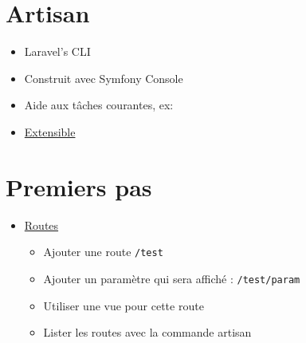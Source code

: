 \hypertarget{artisan}{%
\section{Artisan}\label{artisan}}

\begin{itemize}
\tightlist
\item
  Laravel's CLI
\item
  Construit avec Symfony Console
\item
  Aide aux tâches courantes, ex:
\end{itemize}

\begin{english}

\begin{Shaded}
\begin{Highlighting}[]
 
 
 

 
\end{Highlighting}
\end{Shaded}

\end{english}

\begin{itemize}
\tightlist
\item
  \href{https://laravel.com/docs/master/artisan}{Extensible}
\end{itemize}

\hypertarget{premiers-pas}{%
\section{Premiers pas}\label{premiers-pas}}

\begin{itemize}
\tightlist
\item
  \href{https://laravel.com/docs/master/routing}{Routes}

  \begin{itemize}
  \tightlist
  \item
    Ajouter une route \textenglish{\texttt{/test}}
  \item
    Ajouter un paramètre qui sera affiché :
    \textenglish{\texttt{/test/param}}
  \item
    Utiliser une vue pour cette route
  \item
    Lister les routes avec la commande artisan
  \end{itemize}
\end{itemize}

